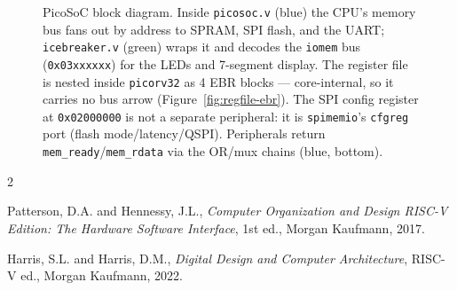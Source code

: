 \documentclass[9pt, a4paper]{extarticle}
\begin{document}
\begin{figure}[htbp]
    \caption{PicoSoC block diagram. Inside \texttt{picosoc.v} (blue) the CPU's memory bus fans out by address to SPRAM, SPI flash, and the UART; \texttt{icebreaker.v} (green) wraps it and decodes the \texttt{iomem} bus (\texttt{0x03xxxxxx}) for the LEDs and 7-segment display. The register file is nested inside \texttt{picorv32} as 4 EBR blocks --- core-internal, so it carries no bus arrow (Figure~\ref{fig:regfile-ebr}). The SPI config register at \texttt{0x02000000} is not a separate peripheral: it is \texttt{spimemio}'s \texttt{cfgreg} port (flash mode/latency/QSPI). Peripherals return \texttt{mem\_ready}/\texttt{mem\_rdata} via the OR/mux chains (blue, bottom).}
    \label{fig:picosoc-block}
\end{figure}

\appendix
\begin{thebibliography}{2}

Patterson, D.A. and Hennessy, J.L.,
\textit{Computer Organization and Design RISC-V Edition: The Hardware Software Interface},
1st ed., Morgan Kaufmann, 2017.

Harris, S.L. and Harris, D.M.,
\textit{Digital Design and Computer Architecture}, RISC-V ed.,
Morgan Kaufmann, 2022.

\end{thebibliography}
\end{document}
